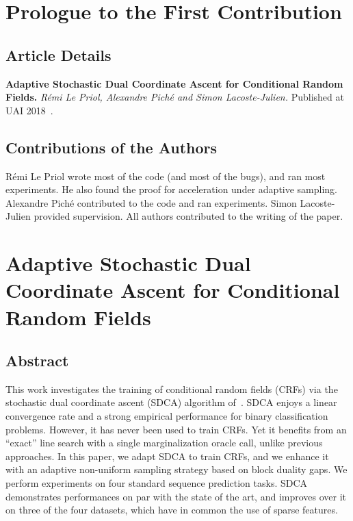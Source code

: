\setcounter{theorem}{0}

\def\balpha{\boldsymbol{\alpha}}
\def\bmu{\boldsymbol{\mu}}
\def\bw{\boldsymbol{w}}
\newcommand{\bu}{\bm u}
\newcommand{\bv}{\bm v}
\newcommand{\strgconvex}{\mu}
\newcommand{\QM}{QM} %

\chapter{Prologue to the First Contribution}

\section{Article Details}

\textbf{Adaptive Stochastic Dual Coordinate Ascent for Conditional Random Fields.} 
\emph{R\'emi Le Priol, Alexandre Pich\'e and Simon Lacoste-Julien.} 
Published at UAI 2018~\citep{lepriol2018adaptive}.

\section{Contributions of the Authors}
Rémi Le Priol wrote most of the code (and most of the bugs), and ran most experiments. 
He also found the proof for acceleration under adaptive sampling.
Alexandre Piché contributed to the code and ran experiments.
Simon Lacoste-Julien provided supervision.
All authors contributed to the writing of the paper.

\chapter{Adaptive Stochastic Dual Coordinate Ascent for Conditional Random Fields}

 \section*{Abstract}
This work investigates the training of conditional random fields (CRFs) via the stochastic dual coordinate ascent (SDCA) algorithm of~\citet{shalev2016accelerated}.
SDCA enjoys a linear convergence rate and a strong empirical performance for binary classification problems.
However, it has never been used to train CRFs.
Yet it benefits from an ``exact'' line search with a single marginalization oracle call, unlike previous approaches.
In this paper, we adapt SDCA to train CRFs, and we enhance it with an adaptive non-uniform sampling strategy based on block duality gaps.
We perform experiments on four standard sequence prediction tasks.
SDCA demonstrates performances on par with the state of the art, and improves over it on three of the four datasets, which have in common the use of sparse features.


